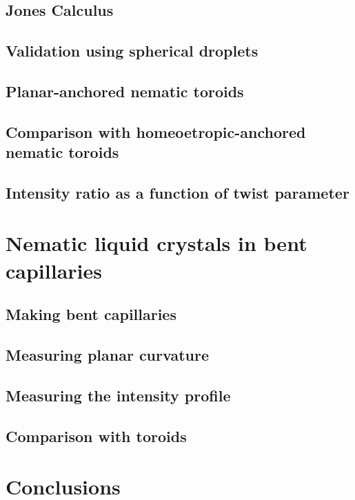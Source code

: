 \subsection{Jones Calculus}
\subsection{Validation using spherical droplets}
\subsection{Planar-anchored nematic toroids}
\subsection{Comparison with homeoetropic-anchored nematic toroids}
\subsection{Intensity ratio as a function of twist parameter}

\section{Nematic liquid crystals in bent capillaries}
\subsection{Making bent capillaries}
\subsection{Measuring planar curvature}
\subsection{Measuring the intensity profile}
\subsection{Comparison with toroids}

\section{Conclusions}
